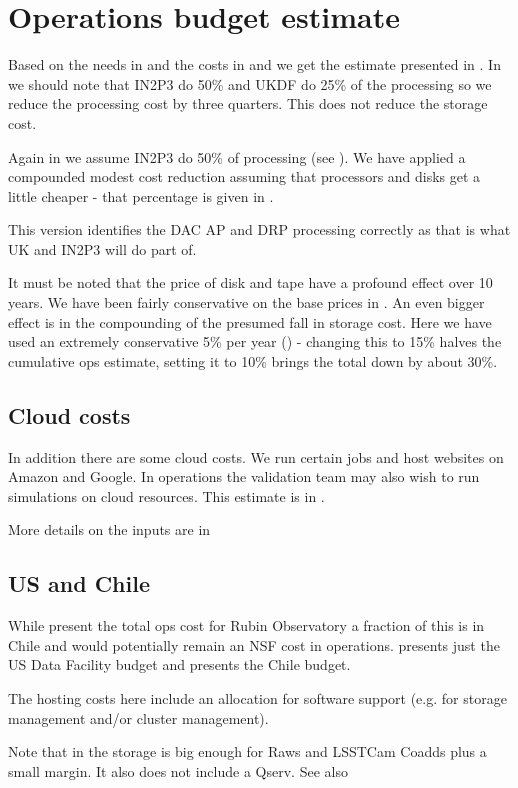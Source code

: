 \section{Operations budget estimate}\label{sec:opscost}
Based on the needs in  and the costs in  and 
we get the estimate presented in .
In  we should note that IN2P3 do 50\%  and UKDF do 25\% of the processing so we reduce the processing cost by three quarters.
This does not reduce the storage cost.



Again in  we assume IN2P3 do 50\% of processing (see ).
We have applied a compounded modest cost reduction assuming that processors  and disks get a little cheaper - that
percentage is given in .

This version identifies the DAC AP and DRP processing correctly as that is what UK and IN2P3 will do part of.

It must be noted that the price of disk and tape have a profound effect over 10 years. We have been fairly conservative on the base prices
in . An even bigger effect is in the compounding of the presumed fall in storage cost. Here we have used an extremely
conservative 5\% per year () - changing this to 15\% halves the cumulative ops estimate, setting it to 10\% brings the
total down by about 30\%.

\subsection{Cloud costs}
In addition there are some cloud costs. We run certain jobs and host websites on Amazon and Google. In operations
the validation team may also wish to run simulations on cloud resources. This estimate is in .




More details on the inputs are in 

\subsection{US and Chile}
While  present the total ops cost for Rubin Observatory a fraction of this is in Chile and would potentially remain an NSF cost in operations.  presents just the US Data Facility budget  and
 presents the Chile budget.

The hosting costs here include an allocation for software support (e.g. for storage management and/or cluster management).



Note that in  the storage is  big enough for Raws  and LSSTCam Coadds plus a small margin. It also does not include a Qserv. See also 

